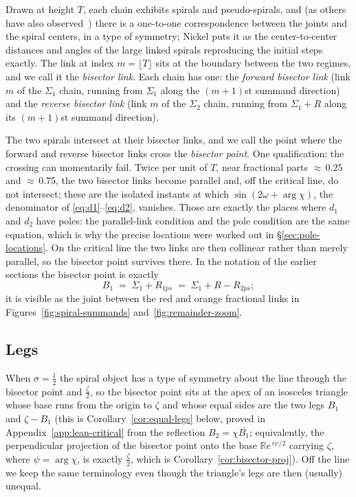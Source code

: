 \documentclass[11pt]{article}
\theoremstyle{definition}
\begin{document}
Drawn at height $T$, each chain exhibits spirals and pseudo-spirals, and (as
others have also observed~\cite{Erickson2005,Lander2018,Nickel2013,Kapitonets2019}) there is a one-to-one correspondence between the
joints and the spiral centers, in a type of symmetry; Nickel puts it as the
center-to-center distances and angles of the large linked spirals reproducing
the initial steps exactly. The link
at index $m=\lfloor T\rfloor$ sits at the boundary between the two
regimes, and we call it the \emph{bisector link}. Each chain has one: the \emph{forward bisector link} (link $m$ of the
$\Sigma_1$ chain, running from $\Sigma_1$ along the $(m+1)$st summand
direction) and the \emph{reverse bisector link} (link $m$ of the $\Sigma_2$
chain, running from $\Sigma_1+R$ along its $(m+1)$st summand direction).

The two spirals intersect at their bisector links, and we call the point where
the forward and reverse bisector links cross the \emph{bisector point}. One
qualification: the crossing can momentarily fail. Twice per unit of $T$, near
fractional parts ${\approx}\,0.25$ and ${\approx}\,0.75$, the two bisector
links become parallel and, off the critical line, do not intersect; these are
the isolated instants at which $\sin(2\omega+\arg\chi)$, the denominator of
\eqref{eq:d1}--\eqref{eq:d2}, vanishes. Those are exactly the places where
$d_1$ and $d_2$ have poles: the parallel-link condition and the pole
condition are the same equation, which is why the precise locations were
worked out in \S\ref{sec:pole-locations}. On the critical line the two links are then collinear rather than
merely parallel, so the bisector point survives there.
In the notation of the earlier sections the bisector point is exactly
\begin{equation}\label{eq:bisector-point}
B_1 \;=\; \Sigma_1 + R_{1ps} \;=\; \Sigma_1 + R - R_{2ps};
\end{equation}
it is visible as the joint between the red and orange fractional
links in Figures~\ref{fig:spiral-summands} and~\ref{fig:remainder-zoom}.

\subsection{Legs}\label{sec:legs}

When $\sigma=\tfrac12$ the spiral object
has a type of symmetry about the line through the bisector point and
$\tfrac{\zeta}{2}$, so the bisector point sits at the apex of an isosceles
triangle whose base runs from the origin to $\zeta$ and whose equal sides are
the two legs $B_1$ and $\zeta-B_1$ (this is Corollary~\ref{cor:equal-legs}
below, proved in Appendix~\ref{app:lean-critical} from the reflection
$B_2=\chi\overline{B_1}$; equivalently, the perpendicular projection of the
bisector point onto the base $\mathbb{R}e^{\,i\psi/2}$ carrying $\zeta$, where
$\psi=\arg\chi$, is exactly $\tfrac{\zeta}{2}$, which is
Corollary~\ref{cor:bisector-proj}). Off the line we keep the same
terminology even though the triangle's legs are then (usually) unequal.
\end{document}
